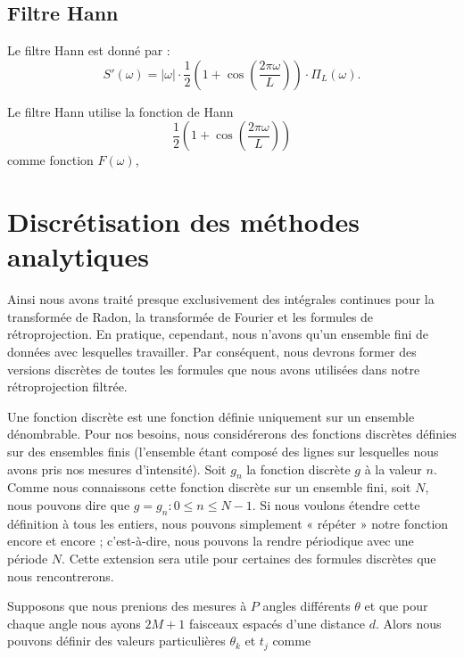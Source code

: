 \subsection*{Filtre Hann}

Le filtre Hann est donné par :
\begin{equation}
S'(\omega) = |\omega| \cdot \frac{1}{2}
\left( 1 + \cos\!\left( \frac{2\pi \omega}{L} \right) \right)
\cdot \Pi_L(\omega).
\end{equation}

Le filtre Hann utilise la fonction de Hann
\begin{equation}
\frac{1}{2}\left( 1 + \cos\!\left( \frac{2\pi \omega}{L} \right) \right)
\end{equation}
comme fonction $F(\omega)$,

\section{Discrétisation des méthodes analytiques}
Ainsi nous avons traité presque exclusivement des intégrales continues pour la transformée de Radon, la transformée de Fourier et les formules de rétroprojection. En pratique, cependant, nous n'avons qu'un ensemble fini de données avec lesquelles travailler. Par conséquent, nous devrons former des versions discrètes de toutes les formules que nous avons utilisées dans notre rétroprojection filtrée.

Une fonction discrète est une fonction définie uniquement sur un ensemble dénombrable. Pour nos besoins, nous considérerons des fonctions discrètes définies sur des ensembles finis (l'ensemble étant composé des lignes sur lesquelles nous avons pris nos mesures d'intensité). Soit \(g_n\) la fonction discrète \(g\) à la valeur \(n\). Comme nous connaissons cette fonction discrète sur un ensemble fini, soit \(N\), nous pouvons dire que \(g = g_n : 0 \le n \le N - 1\). Si nous voulons étendre cette définition à tous les entiers, nous pouvons simplement « répéter » notre fonction encore et encore ; c'est-à-dire, nous pouvons la rendre périodique avec une période \(N\). Cette extension sera utile pour certaines des formules discrètes que nous rencontrerons.

Supposons que nous prenions des mesures à \(P\) angles différents \(\theta\) et que pour chaque angle nous ayons \(2M + 1\) faisceaux espacés d'une distance \(d\). Alors nous pouvons définir des valeurs particulières \(\theta_k\) et \(t_j\) comme

